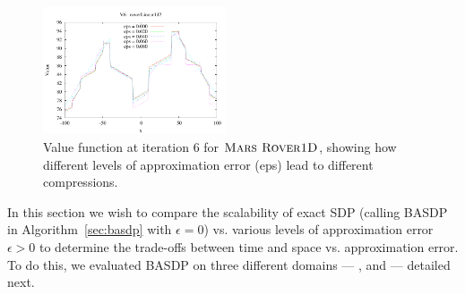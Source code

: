\label{sec:empirical}

\begin{figure}[t!]
\center
\includegraphics[width=0.48\textwidth]{Figures/rover1D/roverLinear1d2V6.pdf} 
\caption{\footnotesize Value function at iteration 6 for $\textsc{Mars Rover1D}$, showing how different levels of approximation error (eps) lead to different compressions.}
\label{fig:rover1dv6} 
\end{figure}

In this section we wish to compare the scalability of exact SDP
(calling BASDP in Algorithm~\ref{sec:basdp} with $\epsilon=0$)
vs. various levels of approximation error $\epsilon > 0$ to determine
the trade-offs between time and space vs. approximation error.
To do this, we evaluated BASDP on three different domains ---
\MarsRoverUni, \MarsRoverBi and \Invent --- detailed next.

